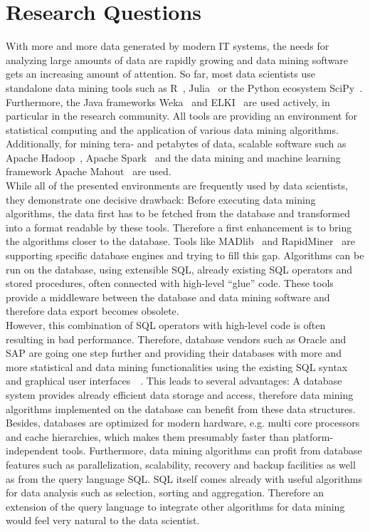 \section{Research Questions}
With more and more data generated by modern IT systems, the needs for analyzing large amounts of data are rapidly growing and data mining software gets an increasing amount of attention. So far, most data scientists use standalone data mining tools such as R~\parencite{R/stats}, Julia~\parencite{DBLP:journals/corr/abs-1209-5145} or the Python ecosystem SciPy~\parencite{scipy}. Furthermore, the Java frameworks Weka~\parencite{Hall:2009:WDM:1656274.1656278} and ELKI~\parencite{DBLP:conf/ssdbm/AchtertKZ08} are used actively, in particular in the research community. All tools are providing an environment for statistical computing and the application of various data mining algorithms. Additionally, for mining tera- and petabytes of data, scalable software such as Apache Hadoop~\parencite{hadoop}, Apache Spark~\parencite{spark} and the data mining and machine learning framework Apache Mahout~\parencite{mahout} are used.
\\
While all of the presented environments are frequently used by data scientists, they demonstrate one decisive drawback: Before executing data mining algorithms, the data first has to be fetched from the database and transformed into a format readable by these tools. Therefore a first enhancement is to bring the algorithms closer to the database. Tools like MADlib~\parencite{MADlib} and RapidMiner~\parencite{rapidminer} are supporting specific database engines and trying to fill this gap. Algorithms can be run on the database, using extensible SQL, already existing SQL operators and stored procedures, often connected with high-level \enquote{glue} code. These tools provide a middleware between the database and data mining software and therefore data export becomes obsolete. 
\\
However, this combination of SQL operators with high-level code is often resulting in bad performance. Therefore, database vendors such as Oracle and SAP are going one step further and providing their databases with more and more statistical and data mining functionalities using the existing SQL syntax and graphical user interfaces~\parencite{oracle}~\parencite{pal}. This leads to several advantages: A database system provides already efficient data storage and access, therefore data mining algorithms implemented on the database can benefit from these data structures. Besides, databases are optimized for modern hardware, e.g. multi core processors and cache hierarchies, which makes them presumably faster than platform-independent tools. Furthermore, data mining algorithms can profit from database features such as parallelization, scalability, recovery and backup facilities as well as from the query language SQL. SQL itself comes already with useful algorithms for data analysis such as selection, sorting and aggregation. Therefore an extension of the query language to integrate other algorithms for data mining would feel very natural to the data scientist. 
